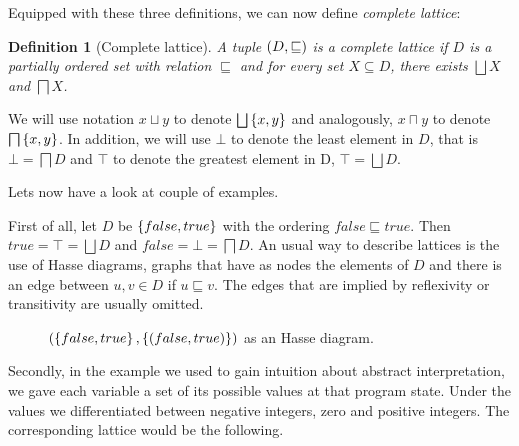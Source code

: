 \documentclass[..thesis.tex]{subfiles}
\newtheorem{defin}{Definition}[section]
\begin{document}
Equipped with these three definitions, we can now define \textit{complete lattice}:

\begin{defin}[Complete lattice]
A tuple $\left( D, \sqsubseteq \right)$ is a complete lattice if $D$ is a partially ordered set with relation $\sqsubseteq$ and for every set $X \subseteq D$, there exists $\bigsqcup X$ and $\bigsqcap X$.
\end{defin}


We will use notation $x \sqcup  y$ to denote $\bigsqcup \left\lbrace x, y \right\rbrace$ and analogously, $x \sqcap y $ to denote $\bigsqcap \lb x, y \rb$. In addition, we will use $\bot$ to denote the least element in $D$, that is $\bot = \bigsqcap D$ and $\top$ to denote the greatest element in D, $\top = \bigsqcup D$.


Lets now have a look at couple of examples. 

First of all, let $D$ be $\left\lbrace false, true \right\rbrace$ with the ordering $false \sqsubseteq true$. Then $true = \top = \bigsqcup D$ and $false = \bot = \bigsqcap D$. An usual way to describe lattices is the use of Hasse diagrams, graphs that have as nodes the elements of $D$ and there is an edge between $u, v \in D$ if $u \sqsubseteq v$. The edges that are implied by reflexivity or transitivity are usually omitted.

\begin{figure}[H]
  \begin{center}
  \end{center}
  \caption{$\left( \left\lbrace false, true \right\rbrace, \left\lbrace \left( false, true \right) \right\rbrace \right)$ as an Hasse diagram.}
\end{figure}
 
Secondly, in the example we used to gain intuition about abstract interpretation, we gave each variable a set of its possible values at that program state. Under the values we differentiated between negative integers, zero and positive integers. The corresponding lattice would be the following.
\end{document}
